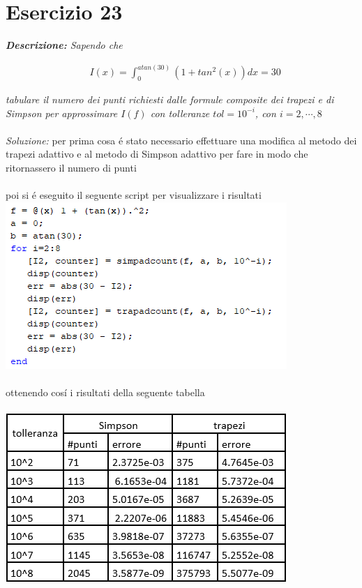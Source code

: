 \section{Esercizio 23}
\textit{\textbf{Descrizione:}  Sapendo che}

\begin{equation}
  \begin{aligned}
      & I(x) =\int_{0}^{atan(30)}(1+tan^{2}(x))dx = 30
  \end{aligned}
\end{equation}

\noindent\textit{tabulare il numero dei punti richiesti dalle formule composite dei trapezi e di Simpson per approssimare $I(f)$ con tolleranze $tol=10^{-i}$, con $i = 2,\cdots,8$}
\\~\\
\noindent\emph{Soluzione: }\newline
per prima cosa \'e stato necessario effettuare una modifica al metodo dei trapezi adattivo e al metodo di Simpson adattivo per fare in modo che ritornassero \newline
il numero di punti\\~\\

\newpage
\newpage
poi si \'e eseguito il seguente script per visualizzare i risultati\newline
\includegraphics[width=1\linewidth]{img/ex23}\\~\\
ottenendo cos\'i i risultati della seguente tabella\\~\\
\includegraphics[width=1.3\linewidth]{img/tabella23}
